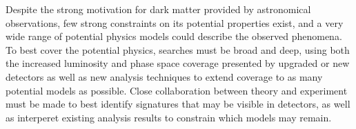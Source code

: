 Despite the strong motivation for dark matter provided by astronomical observations, few strong constraints on its potential properties exist, and a very wide range of potential physics models could describe the observed phenomena.
To best cover the potential physics, searches must be broad and deep, using both the increased luminosity and phase space coverage presented by upgraded or new detectors as well as new analysis techniques to extend coverage to as many potential models as possible. 
Close collaboration between theory and experiment must be made to best identify signatures that may be visible in detectors, as well as interperet existing analysis results to constrain which models may remain.



